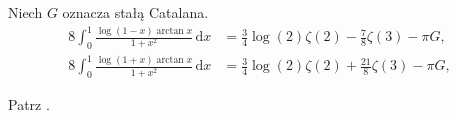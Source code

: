 %

\begin{problem_with_solution}
    \label{valean_1_20}%
    Niech $G$ oznacza stałą Catalana.
    \begin{align}
        8 \int_0^1 \frac{\log (1 - x) \arctan x}{1+x^2} \,\mathrm{d}x & = \frac 3 4 \log (2) \zeta(2) - \frac 7 8 \zeta(3) - \pi G, \\
        8 \int_0^1 \frac{\log (1 + x) \arctan x}{1+x^2} \,\mathrm{d}x & = \frac 3 4 \log (2) \zeta(2) + \frac {21} 8 \zeta(3) - \pi G,
    \end{align} 
\end{problem_with_solution}


\begin{solution}
    Patrz \cite[s. 12]{valean19}.
\end{solution}

%